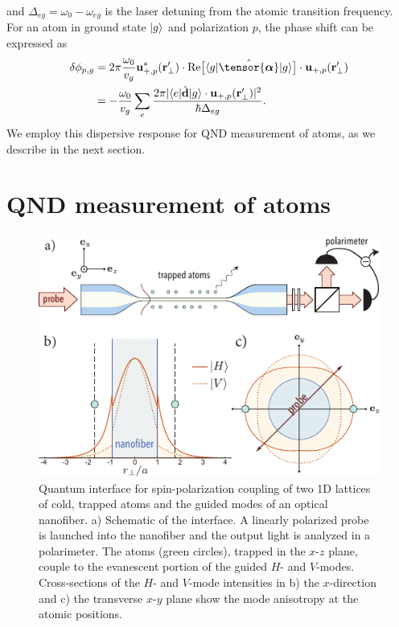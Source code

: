 \documentclass[aps,pra,twocolumn]{revtex4-1} %
\begin{document}
and $\Delta_{eg} = \omega_0 - \omega_{eg}$ is the laser detuning from the atomic transition frequency.	
For an atom in ground state $\lvert{g}\rangle$ and polarization $p$, the phase shift can be expressed as \cite{le_kien_propagation_2014}
	\begin{align} \label{Eq::PhaseShiftMultilevel}
		\delta  \phi_{p,g} &=2\pi \frac{ \omega_{0}}{v_g} \mathbf{u}^*_{+, p}(\br'_\perp) \cdot {\rm Re}\big[\bra{g} 
\hat{\tensor{\boldsymbol{\alpha}}} \ket{g} \big] \cdot \mathbf{u}_{+, p}(\br'_\perp) \nn\\
&= - \frac{ \omega_{0} }{v_g} \sum_e \frac{2 \pi |\bra{e}\hat{\mathbf{d}}\ket{g} \cdot \mathbf{u}_{+,p}(\br'_\perp)|^2}{ \hbar  \Delta_{eg} } .
	\end{align}
We employ this dispersive response for QND measurement of atoms, as we describe in the next section.



\section{QND measurement of atoms} \label{Sec::QNDMeasurement}

\begin{figure}[t]
\includegraphics[scale=1]{./Figs/Fig_NanofiberSchematic}
\caption{Quantum interface for spin-polarization coupling of two 1D lattices of cold, trapped atoms and the guided modes of an optical nanofiber. a) Schematic of the interface.  A linearly polarized probe is launched into the nanofiber and the output light is analyzed in a polarimeter.  The atoms (green circles), trapped in the $x$-$z$ plane, couple to the evanescent portion of the guided $H$- and $V$-modes.  Cross-sections of the $H$- and $V$-mode intensities in b) the $x$-direction and c) the transverse $x$-$y$ plane show the mode anisotropy at the atomic positions. }\label{Fig::Schematic}
\end{figure}
\end{document}
